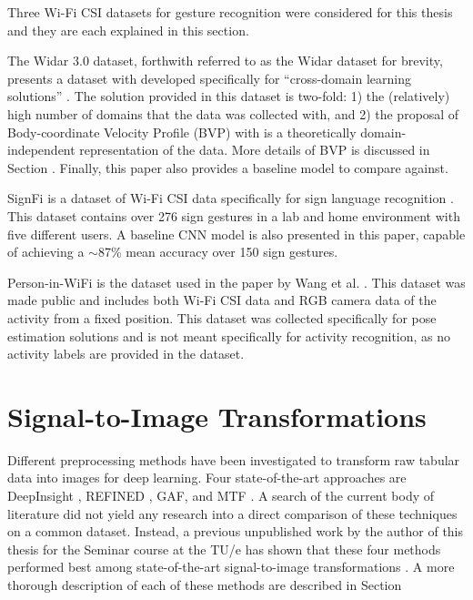 Three Wi-Fi CSI datasets for gesture recognition were considered for this thesis and they are each explained in this section.

The Widar 3.0 dataset, forthwith referred to as the Widar dataset for brevity, presents a dataset with developed specifically for ``cross-domain learning solutions'' \cite{zheng2019zero}.
The solution provided in this dataset is two-fold: 1) the (relatively) high number of domains that the data was collected with, and 2) the proposal of Body-coordinate Velocity Profile (BVP) with is a theoretically domain-independent representation of the data.
More details of BVP is discussed in Section .
Finally, this paper also provides a baseline model to compare against.

SignFi is a dataset of Wi-Fi CSI data specifically for sign language recognition \cite{ma2018signfi}.
This dataset contains over 276 sign gestures in a lab and home environment with five different users.
A baseline CNN model is also presented in this paper, capable of achieving a $\sim$87\% mean accuracy over 150 sign gestures.

Person-in-WiFi is the dataset used in the paper by Wang et al. \cite{wang2019person}.
This dataset was made public and includes both Wi-Fi CSI data and RGB camera data of the activity from a fixed position.
This dataset was collected specifically for pose estimation solutions and is not meant specifically for activity recognition, as no activity labels are provided in the dataset.

\section{Signal-to-Image Transformations}

Different preprocessing methods have been investigated to transform raw tabular data into images for deep learning.
Four state-of-the-art approaches are DeepInsight \cite{sharma2019deepinsight}, REFINED \cite{bazgir2020representation}, GAF, and MTF \cite{wang2015imaging}.
A search of the current body of literature did not yield any research into a direct comparison of these techniques on a common dataset.
Instead, a previous unpublished work by the author of this thesis for the Seminar course at the TU/e has shown that these four methods performed best among state-of-the-art signal-to-image transformations \cite{satyawan2023cnns}.
A more thorough description of each of these methods are described in Section 

